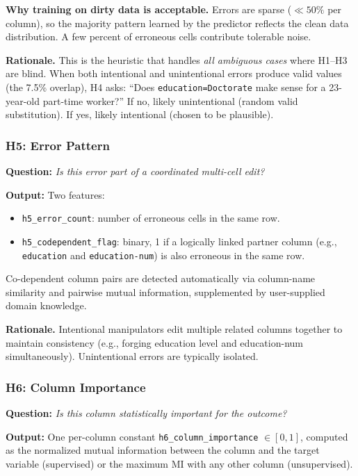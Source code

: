 \documentclass[11pt,a4paper]{article}
\newcommand{\feat}[1]{\texttt{#1}}
\begin{document}
\textbf{Why training on dirty data is acceptable.}
Errors are sparse ($\ll 50\%$ per column), so the majority pattern learned by
the predictor reflects the clean data distribution.  A few percent of
erroneous cells contribute tolerable noise.

\textbf{Rationale.}
This is the heuristic that handles \emph{all ambiguous cases} where H1--H3
are blind.  When both intentional and unintentional errors produce valid
values (the 7.5\% overlap), H4 asks: ``Does \texttt{education=Doctorate}
make sense for a 23-year-old part-time worker?''  If no, likely unintentional
(random valid substitution).  If yes, likely intentional (chosen to be
plausible).

\subsubsection{H5: Error Pattern}

\textbf{Question:} \emph{Is this error part of a coordinated multi-cell edit?}

\textbf{Output:} Two features:
\begin{itemize}[nosep]
  \item \feat{h5\_error\_count}: number of erroneous cells in the same row.
  \item \feat{h5\_codependent\_flag}: binary, 1 if a logically linked partner
        column (e.g., \texttt{education} and \texttt{education-num}) is also
        erroneous in the same row.
\end{itemize}

Co-dependent column pairs are detected automatically via column-name
similarity and pairwise mutual information, supplemented by user-supplied
domain knowledge.

\textbf{Rationale.}
Intentional manipulators edit multiple related columns together to maintain
consistency (e.g., forging education level and education-num simultaneously).
Unintentional errors are typically isolated.

\subsubsection{H6: Column Importance}

\textbf{Question:} \emph{Is this column statistically important for the outcome?}

\textbf{Output:} One per-column constant \feat{h6\_column\_importance}
$\in [0,1]$, computed as the normalized mutual information between the column
and the target variable (supervised) or the maximum MI with any other column
(unsupervised).
\end{document}
